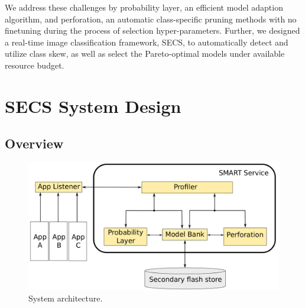 \documentclass[pageno]{jpaper}
\begin{document}
We address these challenges by probability layer, an efficient model adaption algorithm, and perforation, an automatic class-specific pruning methods with no finetuning during the process of selection hyper-parameters. Further, we designed a real-time image classification framework, SECS, to automatically detect and utilize class skew, as well as select the Pareto-optimal models under available resource budget.
























\section{SECS System Design} \label{SECS}
\subsection{Overview}

\begin{figure} 
\includegraphics[scale=0.095]{architecture.png}
\caption{System architecture.}
\label{fig:Architecture}
\end{figure}
\end{document}
